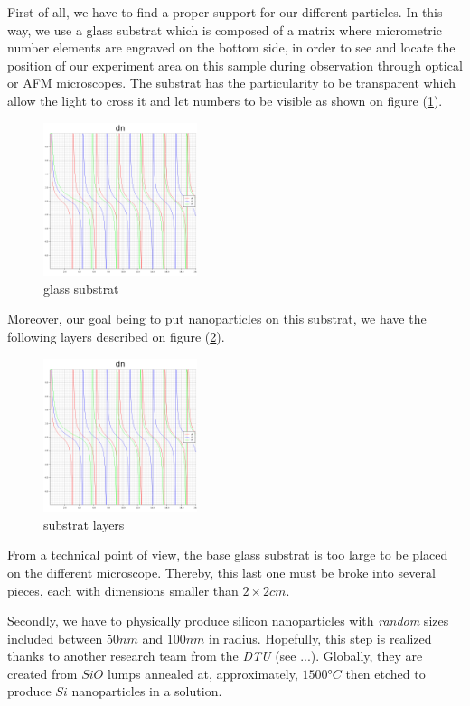 \documentclass{article}
\numberwithin{equation}{section}
\begin{document}
First of all, we have to find a proper support for our different particles. In this way, we use a glass substrat which is composed of a matrix where micrometric number elements are engraved on the bottom side, in order to see and locate the position of our experiment area on this sample during observation through optical or AFM microscopes. The substrat has the particularity to be transparent which allow the light to cross it and let numbers to be visible as shown on figure (\ref{fig:substrat}).
\begin{figure}[h]
    \centering
    \includegraphics[width=0.4\textwidth, height=0.35\textwidth]{dn.png}
    \caption{glass substrat}
    \label{fig:substrat}
\end{figure}
Moreover, our goal being to put nanoparticles on this substrat, we have the following layers described on figure (\ref{fig:substrat_layers}).
\begin{figure}[h]
    \centering
    \includegraphics[width=0.4\textwidth, height=0.35\textwidth]{dn.png}
    \caption{substrat layers}
    \label{fig:substrat_layers}
\end{figure}
From a technical point of view, the base glass substrat is too large to be placed on the different microscope. Thereby, this last one must be broke into several pieces, each with dimensions smaller than $2 \times 2 cm$.

Secondly, we have to physically produce silicon nanoparticles with \textit{random} sizes included between $50 nm$ and $100 nm$ in radius. Hopefully, this step is realized thanks to another research team from the \textit{DTU} (see ...). Globally, they are created from $SiO$ lumps annealed at, approximately, $1500°C$ then etched to produce $Si$ nanoparticles in a solution.
\end{document}
